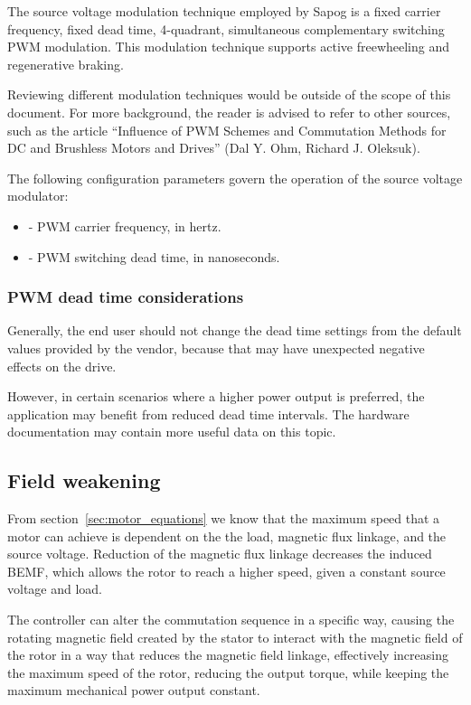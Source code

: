 \documentclass{zubaxdoc}
\begin{document}
The source voltage modulation technique employed by Sapog is a fixed carrier frequency, fixed dead time,
4-quadrant, simultaneous complementary switching PWM modulation.
This modulation technique supports active freewheeling and regenerative braking.

Reviewing different modulation techniques would be outside of the scope of this document.
For more background, the reader is advised to refer to other sources, such as the article
``Influence of PWM Schemes and Commutation Methods for DC and Brushless Motors and Drives''
(Dal Y. Ohm, Richard J. Oleksuk).

The following configuration parameters govern the operation of the source voltage modulator:
\begin{itemize}
	\item {} - PWM carrier frequency, in hertz.
	\item {} - PWM switching dead time, in nanoseconds.
\end{itemize}

\subsubsection{PWM dead time considerations}

Generally, the end user should not change the dead time settings from the default values provided by
the vendor, because that may have unexpected negative effects on the drive.

However, in certain scenarios where a higher power output is preferred, the application may benefit from
reduced dead time intervals.
The hardware documentation may contain more useful data on this topic.

\subsection{Field weakening}\label{sec:field_weakening}

From section~\ref{sec:motor_equations} we know that the maximum speed that a motor can achieve is dependent
on the the load, magnetic flux linkage, and the source voltage.
Reduction of the magnetic flux linkage decreases the induced BEMF, which allows the rotor to reach a higher speed,
given a constant source voltage and load.

The controller can alter the commutation sequence in a specific way, causing the rotating magnetic field
created by the stator to interact with the magnetic field of the rotor in a way that reduces the magnetic
field linkage, effectively increasing the maximum speed of the rotor, reducing the output torque,
while keeping the maximum mechanical power output constant.
\end{document}
